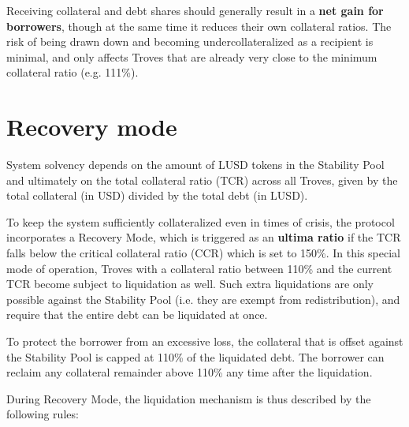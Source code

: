 \documentclass{article}
\begin{document}
Receiving collateral and debt shares should generally result in a \textbf{net gain for borrowers}, though at the same time it reduces their own collateral ratios. The risk of being drawn down and becoming undercollateralized as a recipient is minimal, and only affects Troves that are already very close to the minimum collateral ratio (e.g. 111\%).

\section{Recovery mode}
System solvency depends on the amount of LUSD tokens in the Stability Pool and ultimately on the total collateral ratio (TCR) across all Troves, given by the total collateral (in USD) divided by the total debt (in LUSD). 

To keep the system sufficiently collateralized even in times of crisis, the protocol incorporates a Recovery Mode, which is triggered as an \textbf{ultima ratio} if the TCR falls below the critical collateral ratio (CCR) which is set to 150\%. In this special mode of operation, Troves with a collateral ratio between 110\% and the current TCR become subject to liquidation as well. Such extra liquidations are only possible against the Stability Pool (i.e. they are exempt from redistribution), and require that the entire debt can be liquidated at once. 

To protect the borrower from an excessive loss, the collateral that is offset against the Stability Pool is capped at 110\% of the liquidated debt. The borrower can reclaim any collateral remainder above 110\% any time after the liquidation.

During Recovery Mode, the liquidation mechanism is thus described by the following rules:\\
\end{document}
